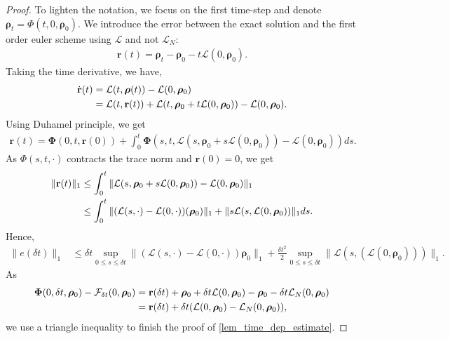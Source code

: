 \documentclass[10pt,a4paper]{amsart}
\newcommand{\xF}{\mathcal{F}}
\newcommand{\xL}{\mathcal{L}}
\begin{document}
\begin{proof}
    To lighten the notation, we focus on the first time-step and denote $\boldsymbol{\rho}_t=\Phi(t,0,\boldsymbol{\rho}_0)$. We introduce the error between the exact solution and the first order euler scheme using $\xL$ and not $\xL_N$:
    \begin{align}
        \mathbf{r}(t)=\boldsymbol{\rho}_{t}-\boldsymbol{\rho}_{0} -t \xL(0,\boldsymbol{\rho}_0).
    \end{align}
    Taking the time derivative, we have,
    \begin{align}
        \notag \dot{\mathbf{r}}(t)&=\xL(t,\boldsymbol{\rho}(t))-\xL(0,\boldsymbol{\rho}_0)\\
        &=\xL(t,\mathbf{r}(t) ) + \xL(t, \boldsymbol{\rho}_0+ t \xL(0,\boldsymbol{\rho}_0))-\xL(0,\boldsymbol{\rho}_0).
    \end{align}
    Using Duhamel principle, we get
    \begin{align}
        \mathbf{r}(t)=\boldsymbol{\Phi}(0,t,\mathbf{r}(0))+\int_0^t\boldsymbol{\Phi}(s,t,\xL(s, \boldsymbol{\rho}_0+ s \xL(0,\boldsymbol{\rho}_0))-\xL(0,\boldsymbol{\rho}_0)) ds.
    \end{align}
    As $\Phi(s,t,\cdot)$ contracts the trace norm and $\mathbf{r}(0)=0$, we get
    \begin{align}
        \notag \|\mathbf{r}(t)\|_1 &\leq \int_0^t \|\xL(s, \boldsymbol{\rho}_0 + s \xL(0,\boldsymbol{\rho}_0))-\xL(0,\boldsymbol{\rho}_0)\|_1\\
        &\leq \int_0^t \|(\xL(s,\cdot)-\xL(0,\cdot))(\boldsymbol{\rho}_0)\|_1 + \|s \xL(s,\xL(0,\boldsymbol{\rho}_0))\|_1 ds.
    \end{align}
    Hence,
    \begin{align}
        \|e(\delta t)\|_1 &\leq\delta t \sup_{0 \leq s \leq \delta t} \| (\xL(s,\cdot)-\xL(0,\cdot))\boldsymbol{\rho}_0\|_1 + \frac{\delta t ^2}{2} \sup_{0 \leq s \leq \delta t} \|\xL(s,(\xL(0,\boldsymbol{\rho}_0)))\|_1.
    \end{align}
    As 
    \begin{align}
        \notag \boldsymbol{\Phi}(0,\delta t,\boldsymbol{\rho}_0)- \xF_{\delta t}(0,\boldsymbol{\rho}_0)&=\mathbf{r}(\delta t)+\boldsymbol{\rho}_0 + \delta t \xL(0,\boldsymbol{\rho}_0)- \boldsymbol{\rho}_0 - \delta t \xL_N(0,\boldsymbol{\rho}_0)\\
        &=\mathbf{r}(\delta t) + \delta t(\xL(0,\boldsymbol{\rho}_0)-\xL_N(0,\boldsymbol{\rho}_0)),
    \end{align}
    we use a triangle inequality to finish the proof of \cref{lem_time_dep_estimate}.
\end{proof}
\end{document}
